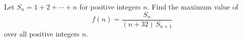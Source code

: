 Let $S_n=1+2+\cdots+n$ for positive integers $n$. Find the maximum value of
\[f(n)=\dfrac{S_n}{(n+32)\,S_{n+1}}\]
over all positive integers $n$.
